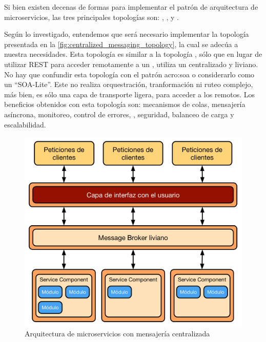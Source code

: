 Si bien existen decenas de formas para implementar el patrón de arquitectura de microservicios, las tres principales topologías son: , , y .\cite[p.~29]{markrichards2015}

Según lo investigado, entendemos que será necesario implementar la topología  presentada en la \autoref{fig:centralized_messaging_topology}, la cual se adecúa a nuestra necesidades.  Esta topología es similar a la topología , sólo que en lugar de utilizar REST para acceder remotamente a un , utiliza un  centralizado y liviano.  No hay que confundir esta topología con el patrón \gls{acro:soa} o considerarlo como un ``SOA-Lite''.  Este  no realiza orquestración, tranformación ni ruteo complejo, más bien, es sólo una capa de transporte ligera, para acceder a los  remotos.  Los beneficios obtenidos con esta topología son: mecanismos de colas, mensajería asíncrona, monitoreo, control de errores, , seguridad, balanceo de carga y escalabilidad.

\begin{figure}[H]
  \includegraphics[width=\linewidth]{src/images/02-capitulo-2/arquitectura-mensajeria-centralizada.png}
  \caption{Arquitectura de microservicios con mensajería centralizada}
  \label{fig:centralized_messaging_topology}
\end{figure}

